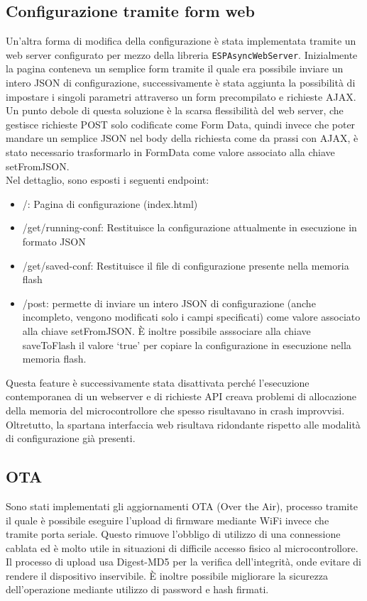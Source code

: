 \documentclass[12pt,a4paper]{report}
\begin{document}
\subsection{Configurazione tramite form web}
Un'altra forma di modifica della configurazione è stata implementata tramite un web server configurato per mezzo della libreria
\texttt{ESPAsyncWebServer}. Inizialmente la pagina conteneva un semplice form tramite il quale era possibile inviare un intero JSON
di configurazione, successivamente è stata aggiunta la possibilità di impostare i singoli parametri attraverso un form precompilato
e richieste AJAX. Un punto debole di questa soluzione è la scarsa flessibilità del web server, che gestisce richieste POST solo codificate
come Form Data, quindi invece che poter mandare un semplice JSON nel body della richiesta come da prassi con AJAX, è stato necessario
trasformarlo in FormData come valore associato alla chiave setFromJSON.\\
Nel dettaglio, sono esposti i seguenti endpoint:
\begin{itemize}
  \item /: Pagina di configurazione (index.html)
  \item /get/running-conf: Restituisce la configurazione attualmente in esecuzione in formato JSON
  \item /get/saved-conf: Restituisce il file di configurazione presente nella memoria flash
  \item /post: permette di inviare un intero JSON di configurazione (anche incompleto, vengono modificati solo i campi specificati) come
        valore associato alla chiave setFromJSON. È inoltre possibile asssociare alla chiave saveToFlash il valore `true' per copiare
        la configurazione in esecuzione nella memoria flash.
\end{itemize}

Questa feature è successivamente stata disattivata perché l'esecuzione contemporanea di un webserver e di richieste API creava
problemi di allocazione della memoria del microcontrollore che spesso risultavano in crash improvvisi. Oltretutto, la spartana
interfaccia web risultava ridondante rispetto alle modalità di configurazione già presenti.

\subsection{OTA}
Sono stati implementati gli aggiornamenti OTA (Over the Air), processo tramite il quale è possibile eseguire l'upload di firmware
mediante WiFi invece che tramite porta seriale. Questo rimuove l'obbligo di utilizzo di una connessione cablata ed è molto utile
in situazioni di difficile accesso fisico al microcontrollore.\\
Il processo di upload usa Digest-MD5 per la verifica dell'integrità, onde evitare di rendere il dispositivo inservibile. È inoltre possibile
migliorare la sicurezza dell'operazione mediante utilizzo di password e hash firmati. \cite{espota}
\end{document}
